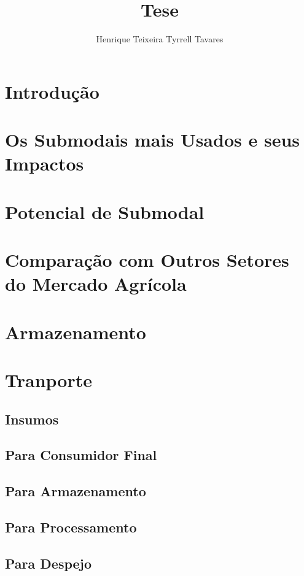 \documentclass[]{article}
\title{Tese}
\author{Henrique Teixeira Tyrrell Tavares}
\begin{document}
	
	\maketitle
	
	\begin{abstract}
		
	\end{abstract}
	
	\section{Introdução}
	
	\section{Os Submodais mais Usados e seus Impactos}
	
	\section{Potencial de Submodal}
	
	\section{Comparação com Outros Setores do Mercado Agrícola}
	
	\section{Armazenamento}
	
	\section{Tranporte}
	
	\subsection{Insumos}
	
	\subsection{Para Consumidor Final}
	
	\subsection{Para Armazenamento}
	
	\subsection{Para Processamento}
	
	\subsection{Para Despejo}
	
	
	
\end{document}
